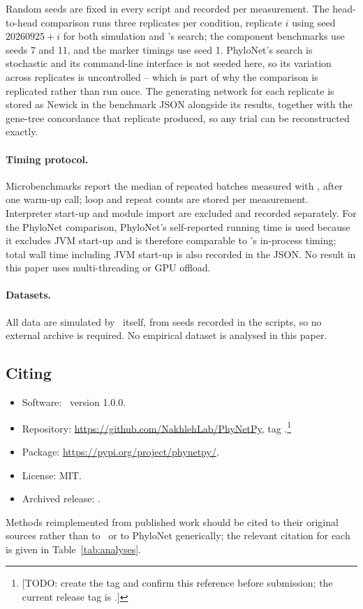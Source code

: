 Random seeds are fixed in every script and recorded per measurement. The
head-to-head comparison runs three replicates per condition, replicate $i$ using
seed $20260925 + i$ for both simulation and \phynetpy's search; the component
benchmarks use seeds 7 and 11, and the marker timings use seed 1. PhyloNet's
search is stochastic and its command-line interface is not seeded here, so its
variation across replicates is uncontrolled -- which is part of why the
comparison is replicated rather than run once. The generating network for each
replicate is stored as Newick in the benchmark JSON alongside its results,
together with the gene-tree concordance that replicate produced, so any trial can
be reconstructed exactly.

\paragraph{Timing protocol.} Microbenchmarks report the median of repeated
batches measured with , after one warm-up call; loop and
repeat counts are stored per measurement. Interpreter start-up and module import
are excluded and recorded separately. For the PhyloNet comparison, PhyloNet's
self-reported running time is used because it excludes JVM start-up and is
therefore comparable to \phynetpy's in-process timing; total wall time including
JVM start-up is also recorded in the JSON. No result in this paper uses
multi-threading or GPU offload.

\paragraph{Datasets.} All data are simulated by \phynetpy\ itself, from seeds
recorded in the scripts, so no external archive is required. No empirical dataset
is analysed in this paper.

\subsection{Citing \phynetpy}

\begin{itemize}
  \item Software: \phynetpy\ version 1.0.0.
  \item Repository: \url{https://github.com/NakhlehLab/PhyNetPy}, tag
    .\footnote{[TODO: create the  tag and confirm this
    reference before submission; the current release tag is .]}
  \item Package: \url{https://pypi.org/project/phynetpy/}.
  \item License: MIT.
  \item Archived release: \cite{TODO_PhyNetPy_archive}.
\end{itemize}

Methods reimplemented from published work should be cited to their original
sources rather than to \phynetpy\ or to PhyloNet generically; the relevant
citation for each is given in Table~\ref{tab:analyses}.

